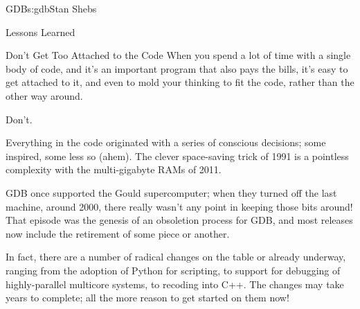\begin{aosachapter}{GDB}{s:gdb}{Stan Shebs}
\begin{aosasect1}{Lessons Learned}
\begin{aosasect2}{Don't Get Too Attached to the Code}
When you spend a lot of time with a single body of code, and it's an
important program that also pays the bills, it's easy to get attached
to it, and even to mold your thinking to fit the code, rather than the
other way around.

Don't.

Everything in the code originated with a series of conscious
decisions; some inspired, some less so (ahem).  The clever
space-saving trick of 1991 is a pointless complexity with the
multi-gigabyte RAMs of 2011.

GDB once supported the Gould supercomputer; when they turned off the
last machine, around 2000, there really wasn't any point in keeping
those bits around!  That episode was the genesis of an obsoletion
process for GDB, and most releases now include the retirement of
some piece or another.

In fact, there are a number of radical changes on the table or already
underway, ranging from the adoption of Python for scripting, to
support for debugging of highly-parallel multicore systems, to
recoding into C++.  The changes may take years to complete; all the
more reason to get started on them now!

\end{aosasect2}

\end{aosasect1}


\end{aosachapter}
